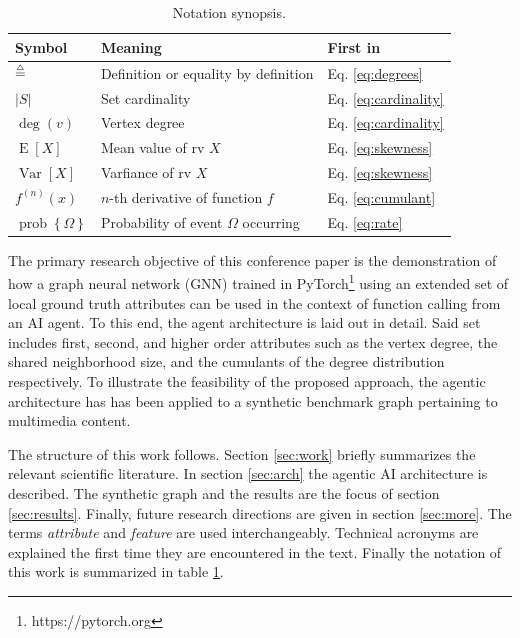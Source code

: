 \documentclass[conference, compsoc, final]{IEEEtran}
\DeclareMathOperator{\bmdegop}{deg}
\DeclareMathOperator{\bmopmean}{E}
\DeclareMathOperator{\bmopvar}{Var}
\DeclareMathOperator{\bmopprob}{prob}
\newcommand{\bmdef}{{\buildrel{{\mathsmaller{\triangle}}}\over{=}}}
\newcommand{\bmparen}[1]{\left({#1}\right)}
\newcommand{\bmder}[1]{{\left({#1}\right)}}
\newcommand{\bmcardinality}[1]{\left\lvert{#1}\right\rvert}
\newcommand{\bmmean}[1]{\bmopmean\left[{#1}\right]}
\newcommand{\bmvar}[1]{\bmopvar\left[{#1}\right]}
\newcommand{\bmprob}[1]{\bmopprob\left\lbrace{#1}\right\rbrace}
\newcommand{\bmdeg}[1]{\bmdegop\left({#1}\right)}
\def\bmwork{conference paper}
\def\bmworkw{work}
\def\bmworkt{text}
\begin{document}
\begin{table}[htbp]
\centering%
\caption{Notation synopsis.}
\label{tab:notation}
    \begin{tabular}{lll} 
    \hline
    \textbf{Symbol}  &  \textbf{Meaning}  &  \textbf{First in}  \\
    \hline
    $\bmdef$                    &  Definition or equality by definition  &  Eq. \eqref{eq:degrees}  \\
    $\bmcardinality{S}$         &  Set cardinality  &  Eq. \eqref{eq:cardinality}  \\
    $\bmdeg{v}$                 &  Vertex degree  &  Eq. \eqref{eq:cardinality}  \\
    $\bmmean{X}$                &  Mean value of rv $X$  &  Eq. \eqref{eq:skewness}  \\
    $\bmvar{X}$                 &  Varfiance of rv $X$  &  Eq. \eqref{eq:skewness}  \\
    $f^\bmder{n}\bmparen{x}$    &  $n$-th derivative of function $f$  &  Eq. \eqref{eq:cumulant}  \\
    $\bmprob{\Omega}$           &  Probability of event $\Omega$ occurring  &  Eq.  \eqref{eq:rate}  \\
    \hline
\end{tabular}
\end{table}

The primary research objective of this \bmwork{} is the demonstration of how a graph neural network (GNN) trained in PyTorch\footnote{https://pytorch.org} using an extended set of local ground truth attributes can be used in the context of function calling from an AI agent. To this end, the agent architecture is laid out in detail. Said set includes first, second, and higher order attributes such as the vertex degree, the shared neighborhood size, and the cumulants of the degree distribution respectively. To illustrate the feasibility of the proposed approach, the agentic architecture has has been applied to a synthetic benchmark graph pertaining to multimedia content.

The structure of this \bmworkw{} follows. Section \ref{sec:work} briefly summarizes the relevant scientific literature. In section \ref{sec:arch} the agentic AI architecture is described. The synthetic graph and the results are the focus of section \ref{sec:results}. Finally, future research directions are given in section \ref{sec:more}. The terms \emph{attribute} and \emph{feature} are used interchangeably. Technical acronyms are explained the first time they are encountered in the \bmworkt. Finally the notation of this \bmworkw{} is summarized in table \ref{tab:notation}. 
\end{document}
